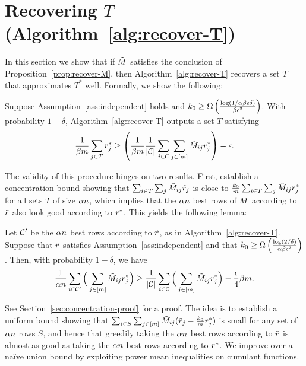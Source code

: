 \section{Recovering $T$ (Algorithm~\ref{alg:recover-T})}
\vskip -0.10in
\label{sec:approach-T}
\label{sec:rounding}

In this section we show that if $\tilde{M}$ satisfies the conclusion of 
Proposition~\ref{prop:recover-M}, then Algorithm~\ref{alg:recover-T} 
recovers a set $T$ that approximates $T^*$ well. Formally, we show 
the following:
\begin{proposition}
\label{prop:recover-T}
Suppose Assumption~\ref{ass:independent} holds and 
$k_0 \geq \Omega\left( \frac{\log(1/\alpha\beta\epsilon\delta)}{\beta\epsilon^2} \right)$. 
With probability $1-\delta$, Algorithm~\ref{alg:recover-T} outputs a set $T$ satisfying 
\begin{equation}
\label{eq:recover-T}
\frac{1}{\beta m}\sum_{j \in T} r^*_j \geq \left( \frac{1}{\beta m}\frac{1}{|\mathcal{C}|}\sum_{i \in \mathcal{C}} \sum_{j \in [m]} \tilde{M}_{ij}r^*_j \right) - \epsilon.
\end{equation}
\end{proposition}
The validity of this procedure hinges on two results. First, establish 
a concentration bound showing that $\sum_{i \in T} \sum_j \tilde{M}_{ij}\tilde{r}_j$ is close to 
$\frac{k_0}{m}\sum_{i \in T} \sum_j \tilde{M}_{ij}r^*_j$ for all sets $T$ of size $\alpha n$, 
which implies that the $\alpha n$ best rows of $\tilde{M}$ according to $\tilde{r}$ also look good 
according to $r^*$. This yields the following lemma:
\begin{lemma}
\label{lem:robs-rtrue}
Let $\mathcal{C}'$ be the $\alpha n$ best rows according to $\tilde{r}$, as 
in Algorithm~\ref{alg:recover-T}. 
Suppose that $\tilde{r}$ satisfies Assumption~\ref{ass:independent} and that
$k_0 \geq \Omega\left( \frac{\log(2/\delta)}{\alpha\beta\epsilon^2} \right)$. 
Then, with probability $1-\delta$, we have
\begin{equation}
\label{eq:robs-rtrue}
\frac{1}{\alpha n} \sum_{i \in \mathcal{C}'} \Big(\sum_{j \in [m]} \tilde{M}_{ij}r^*_j\Big) \geq \frac{1}{|\mathcal{C}|} \sum_{i \in \mathcal{C}} \Big(\sum_{j \in [m]} \tilde{M}_{ij}r^*_j\Big) - \frac{\epsilon}{4}\beta m.
\end{equation}
\end{lemma}
See Section~\ref{sec:concentration-proof} for a proof.
The idea is to establish a uniform bound showing that 
$\sum_{i \in S} \sum_{j \in [m]} \tilde{M}_{ij}(\tilde{r}_j - \frac{k_0}{m}r^*_j)$ is small for any 
set of $\alpha n$ rows $S$, and hence that greedily taking the $\alpha n$ 
best rows according to $\tilde{r}$ is almost as good as taking the $\alpha n$ 
best rows according to $r^*$. We 
improve over a na\"{i}ve union bound by exploiting power mean 
inequalities on cumulant functions. 

